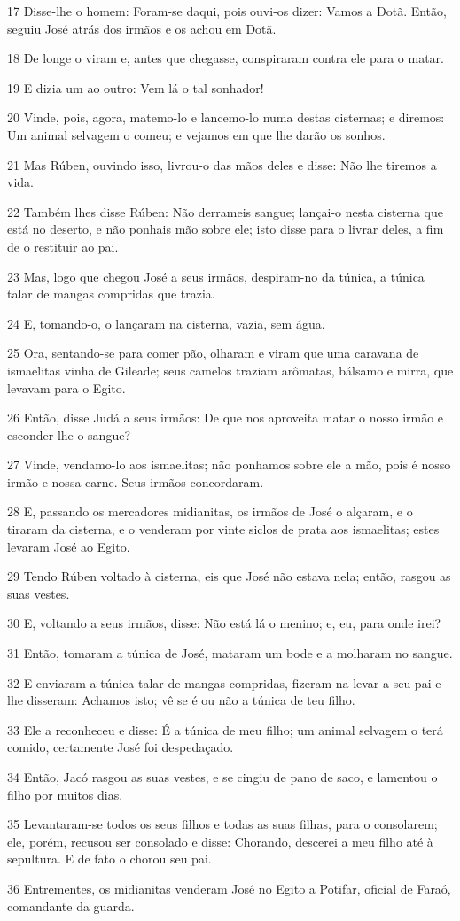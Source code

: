 \par 17 Disse-lhe o homem: Foram-se daqui, pois ouvi-os dizer: Vamos a Dotã. Então, seguiu José atrás dos irmãos e os achou em Dotã.
\par 18 De longe o viram e, antes que chegasse, conspiraram contra ele para o matar.
\par 19 E dizia um ao outro: Vem lá o tal sonhador!
\par 20 Vinde, pois, agora, matemo-lo e lancemo-lo numa destas cisternas; e diremos: Um animal selvagem o comeu; e vejamos em que lhe darão os sonhos.
\par 21 Mas Rúben, ouvindo isso, livrou-o das mãos deles e disse: Não lhe tiremos a vida.
\par 22 Também lhes disse Rúben: Não derrameis sangue; lançai-o nesta cisterna que está no deserto, e não ponhais mão sobre ele; isto disse para o livrar deles, a fim de o restituir ao pai.
\par 23 Mas, logo que chegou José a seus irmãos, despiram-no da túnica, a túnica talar de mangas compridas que trazia.
\par 24 E, tomando-o, o lançaram na cisterna, vazia, sem água.
\par 25 Ora, sentando-se para comer pão, olharam e viram que uma caravana de ismaelitas vinha de Gileade; seus camelos traziam arômatas, bálsamo e mirra, que levavam para o Egito.
\par 26 Então, disse Judá a seus irmãos: De que nos aproveita matar o nosso irmão e esconder-lhe o sangue?
\par 27 Vinde, vendamo-lo aos ismaelitas; não ponhamos sobre ele a mão, pois é nosso irmão e nossa carne. Seus irmãos concordaram.
\par 28 E, passando os mercadores midianitas, os irmãos de José o alçaram, e o tiraram da cisterna, e o venderam por vinte siclos de prata aos ismaelitas; estes levaram José ao Egito.
\par 29 Tendo Rúben voltado à cisterna, eis que José não estava nela; então, rasgou as suas vestes.
\par 30 E, voltando a seus irmãos, disse: Não está lá o menino; e, eu, para onde irei?
\par 31 Então, tomaram a túnica de José, mataram um bode e a molharam no sangue.
\par 32 E enviaram a túnica talar de mangas compridas, fizeram-na levar a seu pai e lhe disseram: Achamos isto; vê se é ou não a túnica de teu filho.
\par 33 Ele a reconheceu e disse: É a túnica de meu filho; um animal selvagem o terá comido, certamente José foi despedaçado.
\par 34 Então, Jacó rasgou as suas vestes, e se cingiu de pano de saco, e lamentou o filho por muitos dias.
\par 35 Levantaram-se todos os seus filhos e todas as suas filhas, para o consolarem; ele, porém, recusou ser consolado e disse: Chorando, descerei a meu filho até à sepultura. E de fato o chorou seu pai.
\par 36 Entrementes, os midianitas venderam José no Egito a Potifar, oficial de Faraó, comandante da guarda.

